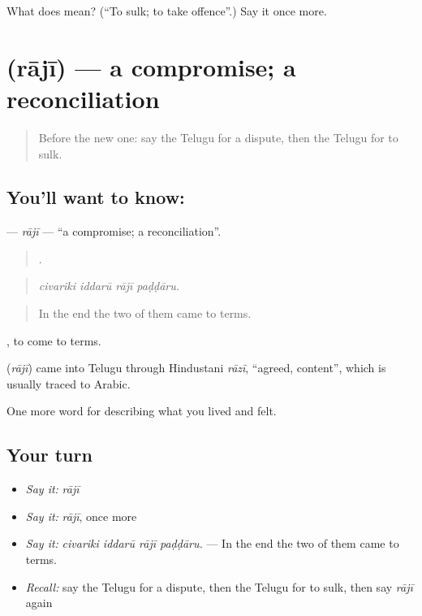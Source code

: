 \begin{tcolorbox}[breakable,colback=teal!4,colframe=teal!35!black,title={Before you move on}]
What does  mean? (\textquotedblleft{}To sulk; to take offence\textquotedblright{}.) Say it once more.
\end{tcolorbox}
\section[\texorpdfstring{\te{రాజీ} (rājī)}{రాజీ (rājī)}]{ (rājī) — a compromise; a reconciliation}

\label{lesson:TE-C534-raji}



\begin{quote}
Before the new one: say the Telugu for a dispute, then the Telugu for to sulk.
\end{quote}

\subsection*{You'll want to know: }
\textbf{} — \emph{rājī} — \textquotedblleft{}a compromise; a reconciliation\textquotedblright{}.

\begin{quote}
   .
\end{quote}

\begin{quote}
\emph{civariki iddarū rājī paḍḍāru.}
\end{quote}

\begin{quote}
In the end the two of them came to terms.
\end{quote}

 , to come to terms.

\begin{cousinweb}
\textbf{} (\emph{rājī}) came into Telugu through Hindustani \emph{rāzī}, \textquotedblleft{}agreed, content\textquotedblright{}, which is usually traced to Arabic.
\end{cousinweb}

\begin{grammarlens}[title={What you've built}]
One more word for describing what you lived and felt.
\end{grammarlens}

\subsection*{Your turn}
\begin{itemize}
\raggedright
  \item \emph{Say it:} \emph{rājī}
  \item \emph{Say it:} \emph{rājī}, once more
  \item \emph{Say it:} \emph{civariki iddarū rājī paḍḍāru.} — In the end the two of them came to terms.
  \item \emph{Recall:} say the Telugu for a dispute, then the Telugu for to sulk, then say \emph{rājī} again
\end{itemize}

